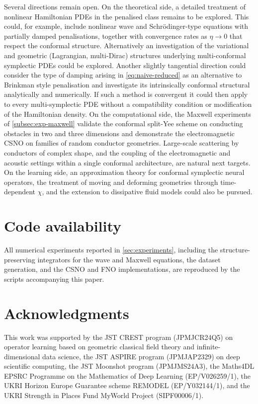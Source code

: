 \documentclass[11pt]{article}
\theoremstyle{definition}
\theoremstyle{remark}
\begin{document}
Several directions remain open.  On the theoretical side, a
detailed treatment of nonlinear Hamiltonian PDEs in the penalised
class remains to be explored. This could, for example, include nonlinear wave and Schr\"odinger-type equations with
partially damped penalisations, together with convergence rates as
$\eta\to0$ that respect the conformal structure. Alternatively an investigation of the variational and geometric (Lagrangian, multi-Dirac) structures underlying multi-conformal symplectic PDEs could be explored. Another slightly tangential direction could consider the type of damping arising in \eqref{eq:naive-reduced} as an alternative to Brinkman style penalisation and investigate its intrinsically conformal structural analytically and numerically. If such a method is convergent it could then apply to every multi-symplectic PDE without a compatibility condition or modification of the Hamiltonian density.  On the computational side, the Maxwell experiments of \cref{subsec:exp-maxwell} validate the conformal split-Yee scheme on conducting obstacles in two and three dimensions and demonstrate the electromagnetic CSNO on families of random conductor geometries. Large-scale scattering by conductors of complex shape, and the coupling of the electromagnetic and acoustic settings within a single conformal architecture, are natural next targets.  On the learning side, an approximation theory for conformal symplectic neural operators, the treatment of moving and deforming geometries through time-dependent $\chi$, and the extension to dissipative fluid models could also be pursued.

\section*{Code availability}
All numerical experiments reported in \cref{sec:experiments},
including the structure-preserving integrators for the wave and
Maxwell equations, the dataset generation, and the CSNO and FNO
implementations, are reproduced by the scripts accompanying this
paper.
\fi 

\section*{Acknowledgments}
This work was supported by the JST CREST program (JPMJCR24Q5) on operator learning based on geometric classical field theory and infinite-dimensional data science, the JST ASPIRE program (JPMJAP2329) on deep scientific computing, the JST Moonshot program (JPMJMS24A3), the Maths4DL EPSRC Programme on the Mathematics of Deep Learning (EP/V026259/1), the UKRI Horizon Europe Guarantee scheme REMODEL (EP/Y032144/1), and the UKRI Strength in Places Fund MyWorld Project (SIPF00006/1).
\end{document}
